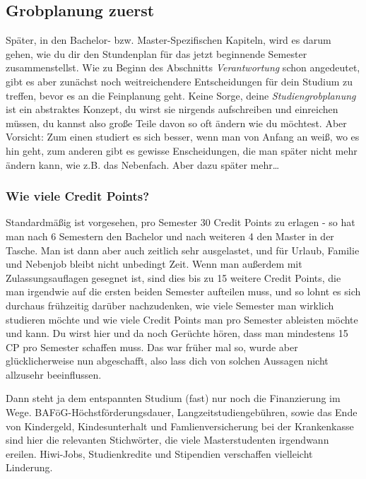 \begin{multicols}{2}
\subsection{Grobplanung zuerst}
\label{grob}
	Später, in den Bachelor- bzw. Master-Spezifischen Kapiteln, wird es darum gehen, wie du dir den Stundenplan für das jetzt beginnende Semester zusammenstellst. Wie zu Beginn des Abschnitts \textit{Verantwortung} schon angedeutet, gibt es aber zunächst noch weitreichendere Entscheidungen für dein Studium zu treffen, bevor es an die Feinplanung geht. Keine Sorge, deine \textit{Studiengrobplanung} ist ein abstraktes Konzept, du wirst sie nirgends aufschreiben und einreichen müssen, du kannst also große Teile davon so oft ändern wie du möchtest. Aber Vorsicht: Zum einen studiert es sich besser, wenn man von Anfang an weiß, wo es hin geht, zum anderen gibt es gewisse Enscheidungen, die man später nicht mehr ändern kann, wie z.B. das Nebenfach. Aber dazu später mehr\ldots

\subsubsection{Wie viele Credit Points?}
	Standardmäßig ist vorgesehen, pro Semester 30 Credit Points zu erlagen - so hat man nach 6 Semestern den Bachelor und nach weiteren 4 den Master  in der Tasche. Man ist dann aber auch zeitlich sehr ausgelastet, und für Urlaub, Familie und Nebenjob bleibt nicht unbedingt Zeit. Wenn man außerdem mit Zulassungsauflagen gesegnet ist, sind dies bis zu 15 weitere Credit Points, die man irgendwie auf die ersten beiden Semester aufteilen muss, und so lohnt es sich durchaus frühzeitig darüber nachzudenken, wie viele Semester man wirklich studieren möchte und wie viele Credit Points man pro Semester ableisten möchte und kann. Du wirst hier und da noch Gerüchte hören, dass man mindestens 15 CP pro Semester schaffen muss. Das war früher mal so, wurde aber glücklicherweise nun abgeschafft, also lass dich von solchen Aussagen nicht allzusehr beeinflussen.

	Dann steht ja dem entspannten Studium (fast) nur noch die Finanzierung im Wege. BAFöG-Höchstförderungsdauer, Langzeitstudiengebühren, sowie das Ende von Kindergeld, Kindesunterhalt und Famlienversicherung bei der Krankenkasse sind hier die relevanten Stichwörter, die viele Masterstudenten irgendwann ereilen. Hiwi-Jobs, Studienkredite und Stipendien verschaffen vielleicht Linderung.


\end{multicols}
